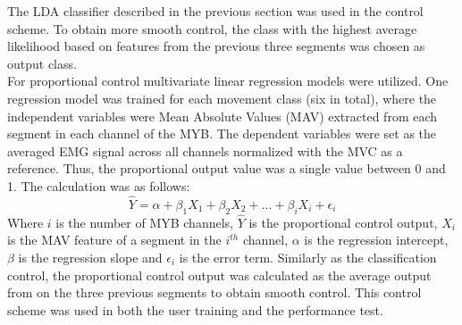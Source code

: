 The LDA classifier described in the previous section was used in the control scheme. To obtain more smooth control, the class with the highest average likelihood based on features from the previous three segments was chosen as output class. \\
For proportional control multivariate linear regression models were utilized. One regression model was trained for each movement class (six in total), where the independent variables were Mean Absolute Values (MAV) extracted from each segment in each channel of the MYB. The dependent variables were set as the averaged EMG signal across all channels normalized with the MVC as a reference. Thus, the proportional output value was a single value between 0 and 1. The calculation was as follows: 
\vspace{-0.2cm}
\begin{equation} \label{eq:P:multiLinearRegression}
\hat{Y} = \alpha + \beta_1 X_{1} + \beta_2 X_{2} + ... + \beta_i X_{i} + \epsilon_i
\end{equation} 
\vspace{-0.05cm}
Where $i$ is the number of MYB channels, $\hat{Y}$ is the proportional control output, $X_{i}$ is the MAV feature of a segment in the $i^{th}$ channel, $\alpha$ is the regression intercept, $\beta$ is the regression slope and $\epsilon_{i}$ is the error term. Similarly as the classification control, the proportional control output was calculated as the average output from on the three previous segments to obtain smooth control. This control scheme was used in both the user training and the performance test.
